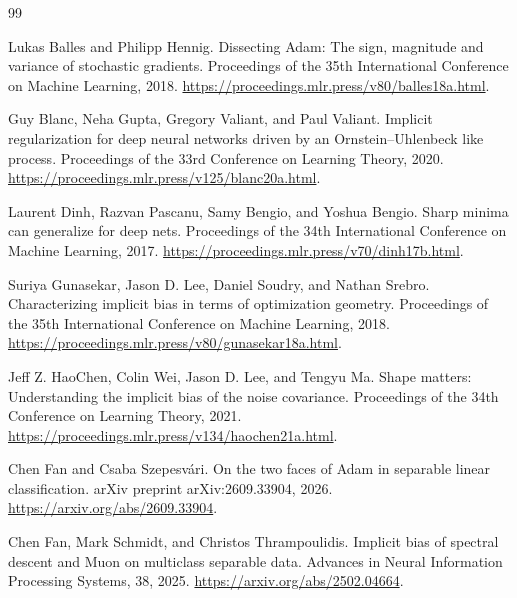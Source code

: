 \documentclass[11pt,twoside]{article}
\theoremstyle{definition}
\theoremstyle{remark}
\begin{document}
\clearpage
\setlength{\bibsep}{4pt}
\begin{thebibliography}{99}

Lukas Balles and Philipp Hennig.
\newblock Dissecting Adam: The sign, magnitude and variance of stochastic
gradients.
\newblock Proceedings of the 35th International Conference on Machine
Learning, 2018.
\newblock \url{https://proceedings.mlr.press/v80/balles18a.html}.

Guy Blanc, Neha Gupta, Gregory Valiant, and Paul Valiant.
\newblock Implicit regularization for deep neural networks driven by an
Ornstein--Uhlenbeck like process.
\newblock Proceedings of the 33rd Conference on Learning Theory, 2020.
\newblock \url{https://proceedings.mlr.press/v125/blanc20a.html}.

Laurent Dinh, Razvan Pascanu, Samy Bengio, and Yoshua Bengio.
\newblock Sharp minima can generalize for deep nets.
\newblock Proceedings of the 34th International Conference on Machine
Learning, 2017.
\newblock \url{https://proceedings.mlr.press/v70/dinh17b.html}.

Suriya Gunasekar, Jason D. Lee, Daniel Soudry, and Nathan Srebro.
\newblock Characterizing implicit bias in terms of optimization geometry.
\newblock Proceedings of the 35th International Conference on Machine
Learning, 2018.
\newblock \url{https://proceedings.mlr.press/v80/gunasekar18a.html}.

Jeff Z. HaoChen, Colin Wei, Jason D. Lee, and Tengyu Ma.
\newblock Shape matters: Understanding the implicit bias of the noise
covariance.
\newblock Proceedings of the 34th Conference on Learning Theory, 2021.
\newblock \url{https://proceedings.mlr.press/v134/haochen21a.html}.

Chen Fan and Csaba Szepesv\'ari.
\newblock On the two faces of Adam in separable linear classification.
\newblock arXiv preprint arXiv:2609.33904, 2026.
\newblock \url{https://arxiv.org/abs/2609.33904}.

Chen Fan, Mark Schmidt, and Christos Thrampoulidis.
\newblock Implicit bias of spectral descent and Muon on multiclass separable
data.
\newblock Advances in Neural Information Processing Systems, 38, 2025.
\newblock \url{https://arxiv.org/abs/2502.04664}.


\end{thebibliography}
\end{document}
